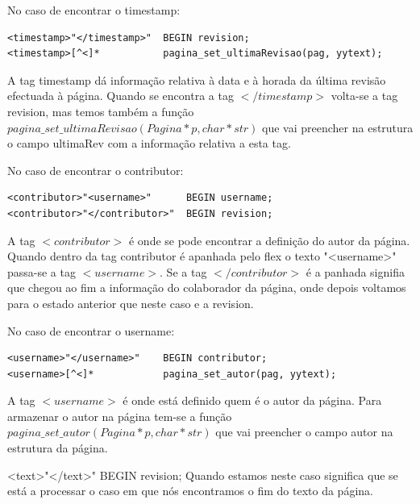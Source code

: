 \documentclass[11pt, a4paper, oneside]{article}
\begin{document}
No caso de encontrar o timestamp:
\begin{verbatim}
<timestamp>"</timestamp>"  BEGIN revision;
<timestamp>[^<]*           pagina_set_ultimaRevisao(pag, yytext);
\end{verbatim}

A tag timestamp dá informação relativa à data e à horada da última revisão efectuada à página.
Quando se encontra a tag \begin{math}</timestamp>\end{math}  volta-se a tag revision, mas  temos também a função\begin{math}pagina\_set\_ultimaRevisao(Pagina* p, char* str)\end{math} que vai preencher na estrutura o campo ultimaRev com a informação relativa a esta tag.


No caso de encontrar o contributor:
\begin{verbatim}
<contributor>"<username>"      BEGIN username;
<contributor>"</contributor>"  BEGIN revision;

\end{verbatim}
A tag \begin{math}<contributor>\end{math} é onde se pode encontrar a definição do autor da página. 
Quando dentro da tag contributor é apanhada pelo flex o texto "<username>" passa-se a tag  \begin{math}<username>\end{math}.
Se a tag \begin{math}</contributor>\end{math} é a panhada signifia que chegou ao fim a informação do colaborador da página, onde depois voltamos para o estado anterior que neste caso e a revision. 

No caso de encontrar o  username:
\begin{verbatim}
<username>"</username>"    BEGIN contributor;
<username>[^<]*            pagina_set_autor(pag, yytext);
\end{verbatim}
A tag \begin{math}<username>\end{math} é onde está definido quem é o autor da página. Para armazenar o autor na página tem-se a função\begin{math}pagina\_set\_autor(Pagina* p, char* str)\end{math} que vai preencher o campo autor na estrutura da página.

<text>"</text>"     BEGIN revision;
Quando estamos neste caso significa que se está a processar o caso em que nós encontramos o fim do texto da página.
\end{document}
